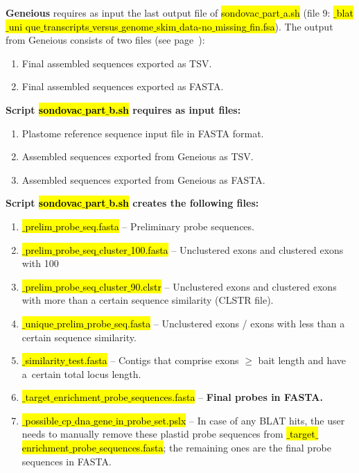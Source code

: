 \documentclass[a4paper, 11pt, twoside]{article}
\renewcommand{\texttt}[1]{\hl{\ttfamily #1}}
\begin{document}
\textbf{Geneious} requires as input the last output file of \texttt{sondovac$\_$part$\_$a.sh} (file 9: \texttt{*$\_$blat$\_$uni\- que$\_$transcripts$\_$versus$\_$genome$\_$skim$\_$data-no$\_$missing$\_$fin.fsa}). The output from Gene\-ious consists of two files (see page~\pageref{geneious-usage}):

\begin{enumerate}
  \item Final assembled sequences exported as TSV.
  \item Final assembled sequences exported as FASTA.
\end{enumerate}

\textbf{Script \texttt{sondovac$\_$part$\_$b.sh} requires as input files:}

\begin{enumerate}
  \item Plastome reference sequence input file in FASTA format.
  \item Assembled sequences exported from Geneious as TSV.
  \item Assembled sequences exported from Geneious as FASTA.
\end{enumerate}

\textbf{Script \texttt{sondovac$\_$part$\_$b.sh} creates the following files:}

\begin{enumerate}
  \item \texttt{*$\_$prelim$\_$probe$\_$seq.fasta} -- Preliminary probe sequences.
  \item \texttt{*$\_$prelim$\_$probe$\_$seq$\_$cluster$\_$100.fasta} -- Unclustered exons and clustered exons with 100%
  \item \texttt{*$\_$prelim$\_$probe$\_$seq$\_$cluster$\_$90.clstr} -- Unclustered exons and clustered exons with more than a certain sequence similarity (CLSTR file).
  \item \texttt{*$\_$unique$\_$prelim$\_$probe$\_$seq.fasta} -- Unclustered exons / exons with less than a certain sequence similarity.
  \item \texttt{*$\_$similarity$\_$test.fasta} -- Contigs that comprise exons $\geq$ bait length and have a~certain total locus length.
  \item \texttt{*$\_$target$\_$enrichment$\_$probe$\_$sequences.fasta} -- \textbf{Final probes in FASTA.}
  \item \texttt{*$\_$possible$\_$cp$\_$dna$\_$gene$\_$in$\_$probe$\_$set.pslx} -- In case of any BLAT hits, the user needs to manually remove these plastid probe sequences from \texttt{*$\_$target$\_$enrichment$\_$probe$\_$se\-quences.fasta}; the remaining ones are the final probe sequences in FASTA.
\end{enumerate}
\end{document}
